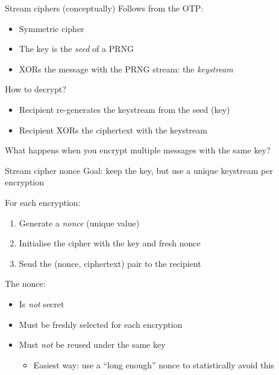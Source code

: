 \begin{frame}{Stream ciphers (conceptually)}
  Follows from the OTP:
  \begin{itemize}[<+(1)->]
    \item Symmetric cipher
    \item The key is the \emph{seed} of a PRNG
    \item XORs the message with the PRNG stream: the \emph{keystream}
  \end{itemize}

  \vspace*{1em}

  \pause
  How to decrypt?
  \begin{itemize}[<+(1)->]
    \item Recipient re-generates the keystream from the seed (key)
    \item Recipient XORs the ciphertext with the keystream
  \end{itemize}

  \vspace*{1em}

  \pause
  What happens when you encrypt multiple messages with the same key?
\end{frame}

\begin{frame}{Stream cipher nonce}
  Goal: keep the key, but use a unique keystream per encryption

  \pause
  For each encryption:
  \begin{enumerate}[<+(1)->]
    \item Generate a \emph{nonce} (unique value)
    \item Initialise the cipher with the key and fresh nonce
    \item Send the (nonce, ciphertext) pair to the recipient
  \end{enumerate}

  \pause
  The nonce:
  \begin{itemize}[<+(1)->]
    \item Is \emph{not} secret
    \item Must be freshly selected for each encryption
    \item Must \emph{not} be reused under the same key
    \par
    \begin{itemize}
      \item Easiest way: use a \enquote{long enough} nonce to statistically avoid this
    \end{itemize}
  \end{itemize}

\end{frame}

